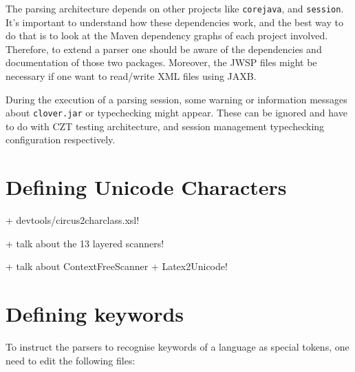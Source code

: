 \documentclass{article}
\begin{document}
The parsing architecture depends on other projects like \texttt{corejava}, and
\texttt{session}. It's important to understand how these dependencies work, and
the best way to do that is to look at the Maven dependency graphs of each project
involved. Therefore, to extend a parser one should be aware of the
dependencies and documentation of those two packages. Moreover, the JWSP files
might be necessary if one want to read/write XML files using JAXB.

During the execution of a parsing session, some warning or information messages
about \texttt{clover.jar} or typechecking might appear. These can be ignored
and have to do with CZT testing architecture, and session management
typechecking configuration respectively.

\section{Defining Unicode Characters}

+ devtools/circus2charclass.xsl!

+ talk about the 13 layered scanners!

+ talk about ContextFreeScanner + Latex2Unicode!

\section{Defining keywords}\label{defining-keywords}

To instruct the parsers to recognise keywords of a language as special tokens,
one need to edit the following files:
\end{document}
